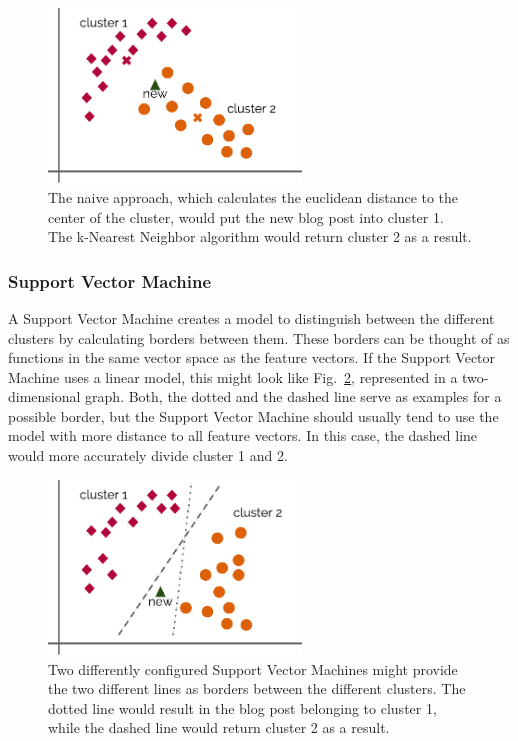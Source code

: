 \begin{figure}[h]
    \centering
    \includegraphics[width=0.6\textwidth]{images/naive.pdf}
    \caption{The naive approach, which calculates the euclidean distance to the center of the cluster, would put the new blog post into cluster 1. The k-Nearest Neighbor algorithm would return cluster 2 as a result.}
    \label{fig:naive}
\end{figure}


\subsubsection{Support Vector Machine}
\label{sec:support_vector_machine}


A Support Vector Machine creates a model to distinguish between the different clusters by calculating borders between them.
These borders can be thought of as functions in the same vector space as the feature vectors.
If the Support Vector Machine uses a linear model, this might look like Fig.~\ref{fig:svm}, represented in a two-dimensional graph.
Both, the dotted and the dashed line serve as examples for a possible border, but the Support Vector Machine should usually tend to use the model with more distance to all feature vectors.
In this case, the dashed line would more accurately divide cluster 1 and 2.


\begin{figure}[h]
    \centering
    \includegraphics[width=0.6\textwidth]{images/svm.pdf}
    \caption{Two differently configured Support Vector Machines might provide the two different lines as borders between the different clusters. The dotted line would result in the blog post belonging to cluster 1, while the dashed line would return cluster 2 as a result.}
    \label{fig:svm}
\end{figure}
